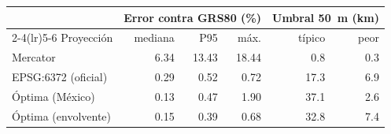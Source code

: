 \begin{tabular}{lrrrrr}
\toprule
 & \multicolumn{3}{c}{Error contra GRS80 (\%)} & \multicolumn{2}{c}{Umbral 50~m (km)} \\
\cmidrule(lr){2-4}\cmidrule(lr){5-6}
Proyección & mediana & P95 & máx. & típico & peor \\
\midrule
Mercator & 6.34 & 13.43 & 18.44 & 0.8 & 0.3 \\
EPSG:6372 (oficial) & 0.29 & 0.52 & 0.72 & 17.3 & 6.9 \\
Óptima (México) & 0.13 & 0.47 & 1.90 & 37.1 & 2.6 \\
Óptima (envolvente) & 0.15 & 0.39 & 0.68 & 32.8 & 7.4 \\
\bottomrule
\end{tabular}
